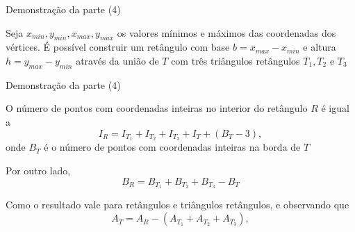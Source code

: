 \begin{frame}[fragile]{Demonstração da parte (4)}

    Seja $x_{min}, y_{min}, x_{max}, y_{max}$ os valores mínimos e máximos das coordenadas dos
        vértices. É possível construir um retângulo com base $b = x_{max} - x_{min}$ e
        altura $h = y_{max} - y_{min}$ através da união de $T$ com três triângulos retângulos
        $T_1, T_2$ e $T_3$

    \begin{figure}
        \centering

    \end{figure}

\end{frame}

\begin{frame}[fragile]{Demonstração da parte (4)}

    O número de pontos com coordenadas inteiras no interior do retângulo $R$ é igual a
    \[
        I_R = I_{T_1} + I_{T_2} + I_{T_3} + I_{T} + (B_{T} - 3),
    \]
    onde $B_T$ é o número de pontos com coordenadas inteiras na borda de $T$

    Por outro lado,
    \[
        B_R = B_{T_1} + B_{T_2} + B_{T_3} - B_{T}
    \]

    Como o resultado vale para retângulos e triângulos retângulos, e observando que
    \[
        A_T = A_R - (A_{T_1} + A_{T_2} + A_{T_3}),
    \]

\end{frame}

